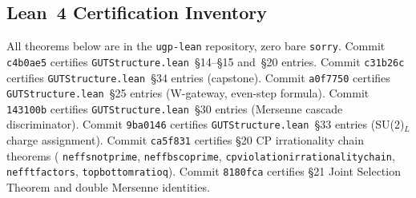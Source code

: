 \documentclass[11pt]{article}
\theoremstyle{remark}
\newcommand{\lean}[1]{%
  \penalty-100
  \begingroup\def\_{\textunderscore\allowbreak}\texttt{#1}\endgroup}
\begin{document}
\begin{appendices}

\section{Lean~4 Certification Inventory}
\label{app:lean}

All theorems below are in the \texttt{ugp-lean} repository, zero bare \texttt{sorry}.
Commit \texttt{c4b0ae5} certifies \texttt{GUTStructure.lean}~\S14--\S15 and~\S20 entries.
Commit \texttt{c31b26c} certifies \texttt{GUTStructure.lean}~\S34 entries (capstone).
Commit \texttt{a0f7750} certifies \texttt{GUTStructure.lean}~\S25 entries (W-gateway, even-step formula).
Commit \texttt{143100b} certifies \texttt{GUTStructure.lean}~\S30 entries (Mersenne cascade discriminator).
Commit \texttt{9ba0146} certifies \texttt{GUTStructure.lean}~\S33 entries (SU(2)$_L$ charge assignment).
Commit \texttt{ca5f831} certifies \S20 CP irrationality chain theorems
(\lean{neff\_s\_not\_prime}, \lean{neff\_b\_s\_coprime}, \lean{cp\_violation\_irrationality\_chain},
\lean{neff\_t\_factors}, \lean{top\_bottom\_ratio\_q}).
Commit \texttt{8180fca} certifies \S21 Joint Selection Theorem and double Mersenne identities.


\end{appendices}
\end{document}

